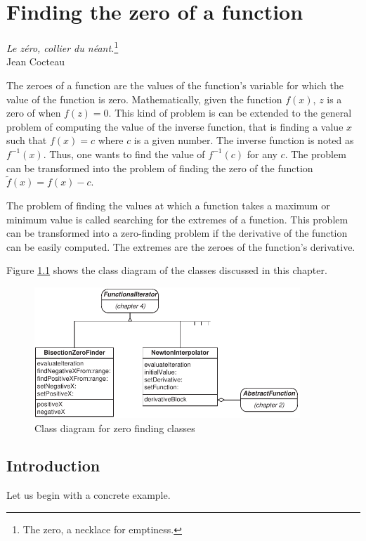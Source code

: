 \documentclass[twoside]{book}
\begin{document}
\fi

\chapter{Finding the zero of a function}
\label{ch:zeroes} \vspace{1 ex}
\begin{flushright} {\sl Le z\'ero, collier du n\'eant.}\footnote{The zero, a necklace for emptiness.}\\ Jean Cocteau
\end{flushright}
\vspace{1 ex}
The zeroes of a function are the values of the
function's variable for which the value of the function is zero.
Mathematically, given the function $f\left(x\right)$, $z$ is a
zero of when $f\left(z\right)=0$. This kind of problem is can be
extended to the general problem of computing the value of the
inverse function, that is finding a value $x$ such that
$f\left(x\right)=c$ where $c$ is a given number. The inverse
function is noted as $f^{-1}\left(x\right)$. Thus, one wants to
find the value of $f^{-1}\left(c\right)$ for any $c$. The problem
can be transformed into the problem of finding the zero of the
function $\tilde{f}\left(x\right)=f\left(x\right)-c$.

The problem of finding the values at which a function takes a
maximum or minimum value is called searching for the extremes of a
function. This problem can be transformed into a zero-finding
problem if the derivative of the function can be easily computed.
The extremes are the zeroes of the function's derivative.

\noindent Figure \ref{cl:zeroFinding} shows the class diagram of
the classes discussed in this chapter.
\begin{figure}
\centering\includegraphics[width=10cm]{Figures/ZeroClassDiagram}
\caption{Class diagram for zero finding
classes}\label{cl:zeroFinding}
\end{figure}


\section{Introduction}
Let us begin with a concrete example.
\end{document}
